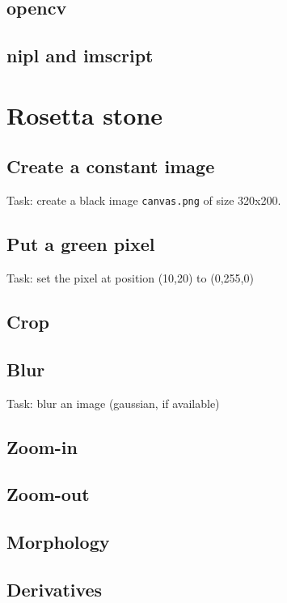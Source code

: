 \subsection{opencv}

\subsection{nipl and imscript}


\section{Rosetta stone}

\subsection{Create a constant image}

Task: create a black image \verb+canvas.png+ of size 320x200.

\subsection{Put a green pixel}

Task: set the pixel at position (10,20) to (0,255,0)

\subsection{Crop}

\subsection{Blur}

Task: blur an image (gaussian, if available)

\subsection{Zoom-in}

\subsection{Zoom-out}

\subsection{Morphology}

\subsection{Derivatives}

